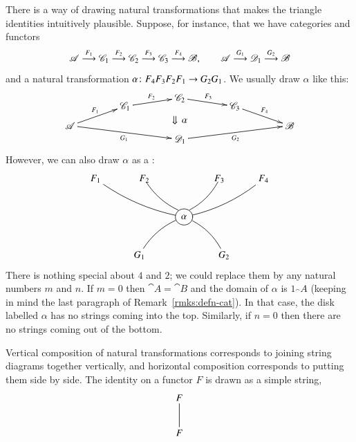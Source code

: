 \begin{remark}
\label{rmk:triangle-string}
There is a way of drawing natural transformations that makes the triangle
identities intuitively plausible.  Suppose, for instance, that we have
categories and functors
\[
\mathscr{A}   \stackrel{F_1}{\longrightarrow}
\mathscr{C}_1 \stackrel{F_2}{\longrightarrow}
\mathscr{C}_2 \stackrel{F_3}{\longrightarrow}
\mathscr{C}_3 \stackrel{F_4}{\longrightarrow}
\mathscr{B},
\qquad
\mathscr{A}   \stackrel{G_1}{\longrightarrow}
\mathscr{D}_1 \stackrel{G_2}{\longrightarrow}
\mathscr{B}
\]
and a natural transformation $\alpha\from F_4 F_3 F_2 F_1 \to G_2 G_1$.  We
usually draw $\alpha$ like this:
\[
\begin{xy}
(-40,5)*+{\cat{A}}="A";
(-20,12)*+{\cat{C}_1}="C1";
(0,15)*+{\cat{C}_2}="C2";
(20,12)*+{\cat{C}_3}="C3";
(40,5)*+{\cat{B}}="B";
(0,0)*+{\cat{D}_1}="D1";
(0,7)*+{\Downarrow\,\alpha};
{\ar^{F_1} "A";"C1"};
{\ar^{F_2} "C1";"C2"};
{\ar^{F_3} "C2";"C3"};
{\ar^{F_4} "C3";"B"};
{\ar_{G_1} "A";"D1"};
{\ar_{G_2} "D1";"B"};
\end{xy}
\]
However, we can also draw $\alpha$ as a :%
%
%
%
\[
\xymatrix{
F_1 \ar@/_/@{-}[drr] &
\hspace{1em}F_2 \ar@/_/@<1ex>@{-}[dr]&
&
\hspace{-1em}F_3 \ar@/^/@<-1ex>@{-}[dl] &
F_4 \ar@/^/@{-}[dll]\\
&&
*+<1pc>[o][F-]{\alpha}\\
&
G_1 \ar@/^/@{-}[ur]&
&
G_2 \ar@/_/@{-}[ul] 
}
\]
There is nothing special about $4$ and $2$; we could replace them by any
natural numbers $m$ and $n$.  If $m = 0$ then $\cat{A} = \cat{B}$ and the
domain of $\alpha$ is $1_\cat{A}$ (keeping in mind the last paragraph of
Remark~\ref{rmks:defn-cat}).  In that case, the
disk labelled $\alpha$ has no strings coming into the top.  Similarly, if
$n = 0$ then there are no strings coming out of the bottom.

Vertical composition of natural transformations corresponds to joining
string diagrams together vertically, and horizontal composition corresponds
to put\-ting them side by side.  The identity on a functor $F$ is drawn as a
simple string,
\[
\xymatrix{
F \ar@{-}[d] \\
F}
\]


\end{remark}

